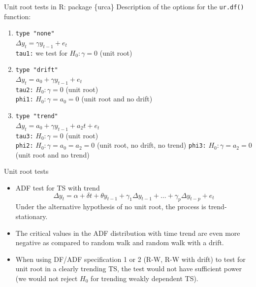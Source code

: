 \documentclass[usenames,dvipsnames]{beamer}
\begin{document}
\begin{frame}{Unit root tests in R: package \{urca\}}
Description of the options for the \texttt{ur.df()} function:
\medskip
\begin{enumerate}
\item \texttt{type "none"} \\
$\Delta y_t = \gamma y_{t-1} + e_t$ ~\\
\texttt{tau1:} we test for $H_0: \gamma = 0$ (unit root) 
\medskip
\item \texttt{type "drift"} \\
$\Delta y_t = a_0 + \gamma y_{t-1} + e_t$ ~\\
\texttt{tau2:} $H_0: \gamma = 0$ (unit root) \\
\texttt{phi1:} $H_0: \gamma = a_0 = 0$ (unit root and no drift) 

\medskip
\item \texttt{type "trend"} \\
$\Delta y_t = a_0 + \gamma y_{t-1} + a_2t + e_t$ ~\\
\texttt{tau3:} $H_0: \gamma = 0$ (unit root) \\
\texttt{phi2:} $H_0: \gamma = a_0 = a_2 = 0$ (unit root, no drift, no trend) 
\texttt{phi3:} $H_0: \gamma = a_2 = 0$ (unit root and no trend) 

\end{enumerate}
\end{frame}


\begin{frame}{Unit root tests}
\begin{itemize}
\item ADF test for TS with trend
$$ \Delta y_t = \alpha + \delta t + \theta y_{t-1} + \gamma_1\Delta y_{t-1}+\dots+\gamma_p\Delta y_{t-p}+e_t$$
Under the alternative hypothesis of no unit root, the process is trend-stationary.
\medskip
\item The critical values in the ADF distribution with time trend are even more negative as compared to random walk and random walk with a drift.
\medskip
\item When using DF/ADF specification 1 or 2 (R-W, R-W with drift) to test for unit root in a clearly trending TS, the test would not have sufficient power (we would not reject $H_0$ for trending weakly dependent TS).
\end{itemize}
\end{frame}

\end{document}
